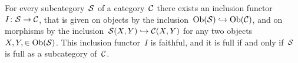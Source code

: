 \begin{example*}
  For every subcategory~$\mathcal{S}$ of a category~$\mathcal{C}$ there exists an inclusion functor~$I \colon \mathcal{S} \to \mathcal{C}$, that is given on objects by the inclusion~$\operatorname{Ob}(\mathcal{S}) \hookrightarrow \operatorname{Ob}(\mathcal{C})$, and on morphisms by the inclusion~$\mathcal{S}(X,Y) \hookrightarrow \mathcal{C}(X,Y)$ for any two objects~$X, Y, \in \operatorname{Ob}(\mathcal{S})$.
  This inclusion functor~$I$ is faithful, and it is full if and only if~$\mathcal{S}$ is full as a subcategory of~$\mathcal{C}$.
\end{example*}




